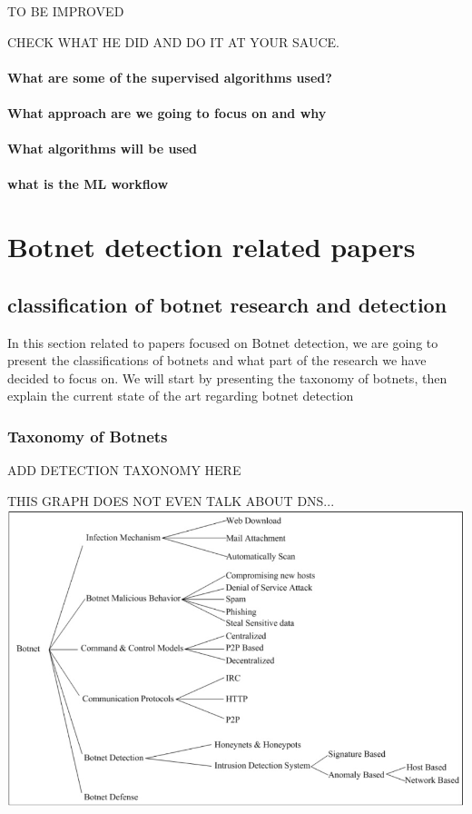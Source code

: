 TO BE IMPROVED

CHECK WHAT HE DID AND DO IT AT YOUR SAUCE.

\paragraph{What are some of the supervised algorithms used?}

\paragraph{What approach are we going to focus on and why}
\paragraph{What algorithms will be used }


\paragraph{what is the ML workflow}

\section{Botnet detection related papers}
\subsection{classification of botnet research and detection}
In this section related to papers focused on Botnet detection, we are going to present the classifications of botnets and what part of the research we have decided to focus on.
We will start by presenting the taxonomy of botnets, then explain the current state of the art regarding botnet detection
\subsubsection{Taxonomy of Botnets}

ADD DETECTION TAXONOMY HERE

THIS GRAPH DOES NOT EVEN TALK ABOUT DNS...
\includegraphics[scale=.8]{img/botnet_taxonomy.jpg}

